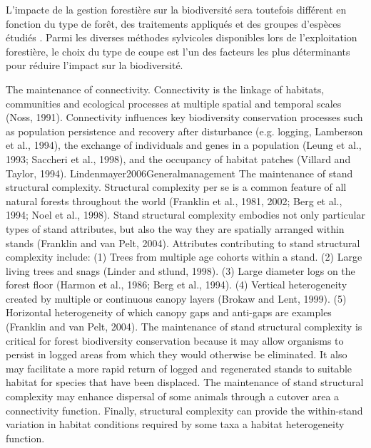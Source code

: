 L'impacte de la gestion forestière sur la biodiversité sera toutefois différent en fonction du type de forêt, des traitements appliqués et des groupes d'espèces étudiés \citep{Paillet2010Biodiversitydifferences,Kudrin2023metaanalysiseffects}. 
Parmi les diverses méthodes sylvicoles disponibles lors de l'exploitation forestière, le choix du type de coupe est l'un des facteurs les plus déterminants pour réduire l'impact sur la biodiversité. 


The maintenance of connectivity. 
Connectivity is the linkage of habitats, communities and ecological processes at multiple spatial and temporal scales (Noss, 1991). 
Connectivity influences key biodiversity conservation processes such as population persistence and recovery after disturbance (e.g. logging, Lamberson et al., 1994), the exchange of individuals and genes in a population (Leung et al., 1993; Saccheri et al., 1998), and the occupancy of habitat patches (Villard and Taylor, 1994). Lindenmayer2006Generalmanagement
The maintenance of stand structural complexity. 
Structural complexity per se is a common feature of all natural forests throughout the world (Franklin et al., 1981, 2002; Berg et al., 1994; Noel et al., 1998). 
Stand structural complexity embodies not only particular types of stand attributes, but also the way they are spatially arranged within stands (Franklin and van Pelt, 2004). 
Attributes contributing to stand structural complexity include: (1) Trees from multiple age cohorts within a stand. 
(2) Large living trees and snags (Linder and stlund, 1998). (3) Large diameter logs on the forest floor (Harmon et al., 1986; Berg et al., 1994). 
(4) Vertical heterogeneity created by multiple or continuous canopy layers (Brokaw and Lent, 1999). 
(5) Horizontal heterogeneity of which canopy gaps and anti-gaps are examples (Franklin and van Pelt, 2004). 
The maintenance of stand structural complexity is critical for forest biodiversity conservation because it may allow organisms to persist in logged areas from which they would otherwise be eliminated. 
It also may facilitate a more rapid return of logged and regenerated stands to suitable habitat for species that have been displaced. 
The maintenance of stand structural complexity may enhance dispersal of some animals through a cutover area a connectivity function. 
Finally, structural complexity can provide the within-stand variation in habitat conditions required by some taxa a habitat heterogeneity function.

